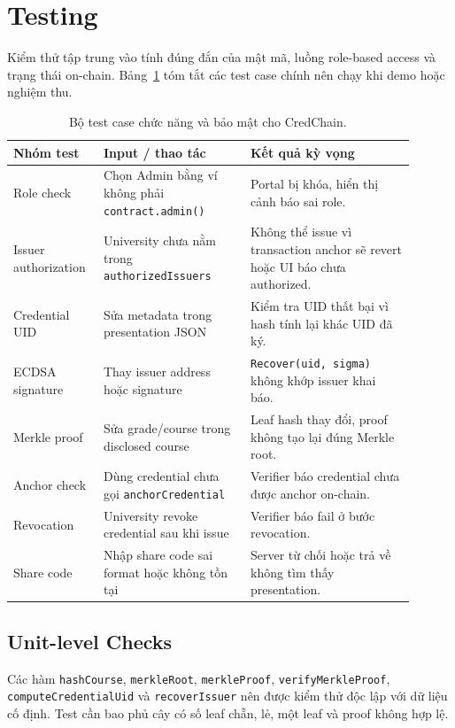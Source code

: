 \section{Testing}

Kiểm thử tập trung vào tính đúng đắn của mật mã, luồng role-based access và trạng thái on-chain. Bảng~\ref{tab:testcases} tóm tắt các test case chính nên chạy khi demo hoặc nghiệm thu.

\begin{table}[t]
\centering
\small
\begin{tabular}{p{0.18\linewidth}p{0.34\linewidth}p{0.38\linewidth}}
\toprule
\textbf{Nhóm test} & \textbf{Input / thao tác} & \textbf{Kết quả kỳ vọng} \\
\midrule
Role check & Chọn Admin bằng ví không phải \texttt{contract.admin()} & Portal bị khóa, hiển thị cảnh báo sai role. \\
Issuer authorization & University chưa nằm trong \texttt{authorizedIssuers} & Không thể issue vì transaction anchor sẽ revert hoặc UI báo chưa authorized. \\
Credential UID & Sửa metadata trong presentation JSON & Kiểm tra UID thất bại vì hash tính lại khác UID đã ký. \\
ECDSA signature & Thay issuer address hoặc signature & \texttt{Recover(uid, sigma)} không khớp issuer khai báo. \\
Merkle proof & Sửa grade/course trong disclosed course & Leaf hash thay đổi, proof không tạo lại đúng Merkle root. \\
Anchor check & Dùng credential chưa gọi \texttt{anchorCredential} & Verifier báo credential chưa được anchor on-chain. \\
Revocation & University revoke credential sau khi issue & Verifier báo fail ở bước revocation. \\
Share code & Nhập share code sai format hoặc không tồn tại & Server từ chối hoặc trả về không tìm thấy presentation. \\
\bottomrule
\end{tabular}
\caption{Bộ test case chức năng và bảo mật cho CredChain.}
\label{tab:testcases}
\end{table}

\subsection{Unit-level Checks}

Các hàm \texttt{hashCourse}, \texttt{merkleRoot}, \texttt{merkleProof}, \texttt{verifyMerkleProof}, \texttt{computeCredentialUid} và \texttt{recoverIssuer} nên được kiểm thử độc lập với dữ liệu cố định. Test cần bao phủ cây có số leaf chẵn, lẻ, một leaf và proof không hợp lệ.

